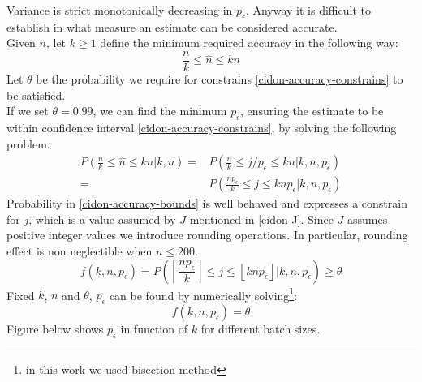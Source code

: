 \documentclass[12pt,a4paper]{report}
\newcommand{\pc}{p_{\epsilon}}
\begin{document}
Variance is strict monotonically decreasing in $\pc$.
Anyway it is difficult to establish in what measure an estimate can be considered accurate.\\
Given $n$, let $k \geq1$ define the minimum required accuracy in the following way: 
\begin{equation}
\frac{n}{k}\leq\hat{n}\leq kn
\label{cidon-accuracy-constrains}
\end{equation}
Let $\theta$ be the probability we require for constrains \eqref{cidon-accuracy-constrains} to be satisfied.\\
If we set $\theta=0.99$, we can find the minimum $\pc$, ensuring the estimate to be within confidence interval \eqref{cidon-accuracy-constrains}, by solving the following problem.\\
\begin{equation}
\begin{split}
P\left(\frac{n}{k}\leq \hat{n} \leq kn \big| k,n\right)=& P\left(\frac{n}{k}\leq j/\pc \leq kn \big| k,n,\pc\right)\\
=&P\left(\frac{n\pc}{k}\leq j \leq kn\pc \big| k,n,\pc\right)
\end{split}
\label{cidon-accuracy-bounds}
\end{equation}
Probability in \eqref{cidon-accuracy-bounds} is well behaved and expresses a constrain for $j$, which is a value assumed by $J$ mentioned in \eqref{cidon-J}. Since $J$ assumes positive integer values we introduce rounding operations. In particular, rounding effect is non neglectible when $n\leq 200$.  \\
\begin{equation}
f(k,n,\pc) = P\left(\left\lceil \frac{n\pc}{k}\right\rceil\leq j \leq \left\lfloor kn\pc\right\rfloor \big| k,n,\pc\right)\geq \theta
\end{equation}
Fixed $k$, $n$ and $\theta$, $\pc$ can be found by numerically solving\footnote{in this work we used bisection method}:
\begin{equation}
f(k,n,\pc) = \theta
\end{equation}
Figure below shows $\pc$ in function of $k$ for different batch sizes.\\
\end{document}
